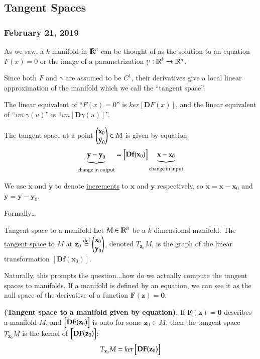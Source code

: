 \subsection{Tangent Spaces}
\subsubsection*{February 21, 2019}


As we saw, a $k$-manifold in $\mathbb{R}^n$ can be thought of as the solution to an equation $F(x)=0$ or the image of a parametrization $\gamma : \mathbb{R}^k \to \mathbb{R}^{n}$.

Since both $F$ and $\gamma$ are assumed to be $C^1$, their derivatives give a local linear approximation of the manifold which we call the ``tangent space''.

The linear equivalent of ``$F(x)=0$'' is $ker[\bm{D}F(x)]$, and the linear equivalent of ``$im\ \gamma(u)$'' is ``$im[\bm{D}\gamma(u)]$''.

The tangent space at a point $\begin{pmatrix} \textbf{x}_0 \\ \textbf{y}_0 \end{pmatrix}\in M$ is given by equation
\begin{equation}
	\underbrace{\textbf{y}-\textbf{y}_0}_{\text{change in output}} = \begin{bmatrix} \textbf{Df}(\textbf{x}_0) \end{bmatrix}\underbrace{\textbf{x}-\textbf{x}_0}_{\text{change in input}}
\end{equation}

We use $\dot{\bm{x}}$ and $\dot{\bm{y}}$ to denote \ul{increments} to $\bm{x}$ and $\bm{y}$ respectively, so $\dot{\bm{x}} = \bm{x}-\bm{x}_0$ and $\dot{\bm{y}} = \bm{y}-\bm{y}_0$. 

Formally\dots 
\begin{defn}{Tangent space to a manifold}
	Let $M\in \mathbb{R}^n$ be a $k$-dimensional manifold. The \ul{tangent space} to $M$ at $\textbf{z}_0\overset{\text{def}}{=}\begin{pmatrix} \textbf{x}_0 \\ \textbf{y}_0 \end{pmatrix}$, denoted $T_{\bm{z}_0}M$, is the graph of the linear transformation $[\bm{Df}(\bm{x}_0)]$. 
\end{defn}

Naturally, this prompts the question...how do we actually compute the tangent spaces to manifolds. If a manifold is defined by an equation, we can see it as the null space of the derivative of a function $\bm{F}(\bm{z}) = \bm{0}$. 
\begin{theorem}
	\textbf{(Tangent space to a manifold given by equation).} If $\bm{F}(\bm{z}) = \bm{0}$ describes a manifold $M$, and $\begin{bmatrix} \textbf{DF}(\textbf{z}_0) \end{bmatrix}$ is onto for some $\bm{z}_0\in M$, then the tangent space $T_{\bm{z}_0}M$ is the kernel of $\begin{bmatrix} \textbf{DF}(\textbf{z}_0) \end{bmatrix}$:
	\begin{equation}
		T_{\textbf{z}_0}M = ker \begin{bmatrix} \textbf{DF}(\textbf{z}_0) \end{bmatrix}
	\end{equation}
\end{theorem}

